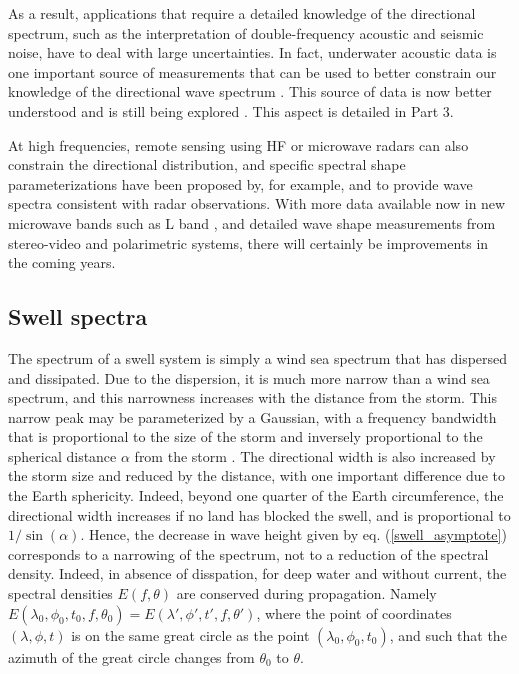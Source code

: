 As a result, applications that require a detailed knowledge of the directional spectrum, such as the interpretation of double-frequency 
acoustic and seismic noise, have to deal with large uncertainties. In fact, underwater acoustic data is one important source 
of measurements that can be used to better constrain our knowledge of the directional wave spectrum \citep{Tyler&al.1974}. This 
source of data is now  better understood \citep{Ardhuin&al.2013} and is still  being explored  \citep{Farrell&Munk2008,Duennebier&al.2012,Peureux&Ardhuin2016}. 
This aspect is detailed in Part 3. 

At high frequencies, remote sensing using HF \citep[e.g.][]{Kirincich2016} or microwave radars can also constrain the directional distribution, and specific spectral 
shape parameterizations have been proposed by, for example, \citep{Elfouhaily&al.1997} and \citep{Kudryavtsev&al.2003a}
 to provide  wave spectra  consistent with radar observations. With more data available now in new microwave bands 
such as L band \citep[e.g.][]{Yueh&al.2013}, and detailed wave shape measurements from stereo-video and polarimetric systems, 
there will certainly be improvements in the coming years. 



\subsection{Swell spectra}
The spectrum of a swell system is simply a wind sea spectrum that has dispersed 
and dissipated. Due to the dispersion, it is much more narrow than a wind sea spectrum, and this narrowness increases with the 
distance from the storm. This narrow peak may be parameterized by a Gaussian, with a frequency bandwidth that is  proportional
to the size of the storm and inversely proportional to the spherical distance $\alpha$  from the storm \citep{Collard&al.2009}. 
The directional width is also increased by the storm size and reduced by the distance, with one important difference due to the Earth 
sphericity. Indeed, beyond one quarter of the Earth circumference, the directional width increases 
if no land has blocked the swell, and is proportional to  $1/\sin (\alpha)$. Hence, the 
decrease in wave height given by eq. (\ref{swell_asymptote}) 
corresponds to a narrowing of the spectrum, not to a reduction of the spectral density. Indeed, 
in absence of disspation, for deep water and without current, the 
spectral densities  $E(f,\theta)$ are conserved during propagation. Namely 
$E(\lambda_0,\phi_0,t_0,f,\theta_0)=E(\lambda',\phi',t',f,\theta')$, where the point of coordinates  $(\lambda,\phi,t)$ is on the same 
great circle as the point  $(\lambda_0,\phi_0,t_0)$, and such that the azimuth of the great circle changes from $\theta_0$ to $\theta$. 

